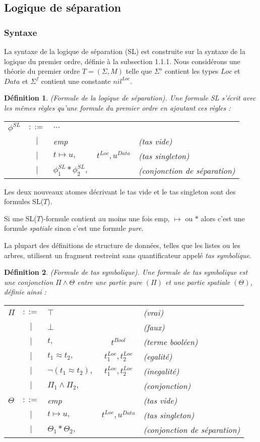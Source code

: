 \documentclass[11pt,openany]{article}
\newtheorem{definition}{D\'efinition}[subsection]
\begin{document}
	\subsection{Logique de s\'eparation}
		\subsubsection{Syntaxe}
	La syntaxe de la logique de s\'eparation (SL)\cite{OHearnRY01} est construite sur la syntaxe de la logique du premier ordre, d\'efinie \`a la subsection 1.1.1. Nous consid\'erons une th\'eorie du premier ordre $T=(\Sigma,M)$ telle que $\Sigma^{s}$ contient les types $Loc$ et $Data$ et $\Sigma^{f}$ contient une constante $nil^{Loc}$.
	\begin{definition}
	(Formule de la logique de s\'eparation). Une formule SL s'\'ecrit avec les m\^emes r\`egles qu'une formule du premier ordre en ajoutant ces r\`egles :
	
	\begin{tabular}{lclcl}
		$\phi^{SL}$ & $ ::= $ & $\ldots$ & \\
		& $|$ & emp & & (tas vide)\\
		& $|$ & $t\mapsto u,$ & $t^{Loc},u^{Data}$ & (tas singleton)\\
		& $|$ & $\phi_{1}^{SL} * \phi_{2}^{SL},$ & & (conjonction de s\'eparation)
	\end{tabular}
	\end{definition}
	
	Les deux nouveaux atomes d\'ecrivant le tas vide et le tas singleton sont des formules SL($T$).
	
	Si une SL($T$)-formule contient au moins une fois emp, $\mapsto$ ou $*$ alors c'est une formule \textit{spatiale} sinon c'est une formule \textit{pure}.
	
	La plupart des d\'efinitions de structure de donn\'ees, telles que les listes ou les arbres, utilisent un fragment restreint sans quantificateur appel\'e \textit{tas symbolique}.
\begin{definition}
(Formule de tas symbolique). Une formule de \textit{tas symbolique} est une conjonction $\Pi\land\Theta$ entre une partie pure $(\Pi)$ et une partie spatiale $(\Theta)$, d\'efinie ainsi :\\
\begin{tabular}{lclcl}
$\Pi$ & $::=$ & $\top$ & &(vrai)\\
& $|$ & $\bot$ & &(faux)\\
& $|$ & $t,$ & $t^{Bool}$  & (terme bool\'een)\\
& $|$ & $t_{1}\approx t_{2},$ & $t^{Loc}_{1},t^{Loc}_{2}$ & (egalit\'e)\\
& $|$ & $\neg(t_{1}\approx t_{2}),$ & $t^{Loc}_{1},t^{Loc}_{2}$ & (inegalit\'e)\\
& $|$ & $\Pi_{1}\land\Pi_{2},$& &(conjonction)\\
$\Theta$ & $::=$ & emp & &(tas vide)\\
& $|$ & $t\mapsto u,$ & $t^{Loc},u^{Data}$ & (tas singleton)\\
& $|$ & $\Theta_{1}*\Theta_{2},$ & & (conjonction de s\'eparation)
\end{tabular}

\end{definition}
\end{document}
